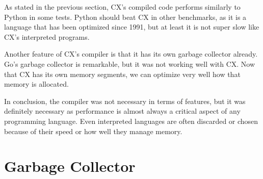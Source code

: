 \documentclass[11pt,fleqn,openany]{book} %
\begin{document}
As stated in the previous section, CX's compiled code performs similarly to Python in some tests. Python should beat CX in other benchmarks, as it is a language that has been optimized since 1991, but at least it is not super slow like CX's interpreted programs.

Another feature of CX's compiler is that it has its own garbage collector already. Go's garbage collector is remarkable, but it was not working well with CX. Now that CX has its own memory segments, we can optimize very well how that memory is allocated.

In conclusion, the compiler was not necessary in terms of features, but it was definitely necessary as performance is almost always a critical aspect of any programming language. Even interpreted languages are often discarded or chosen because of their speed or how well they manage memory.


\chapter{Garbage Collector}
\label{chapter:garbage-collector}
\end{document}
